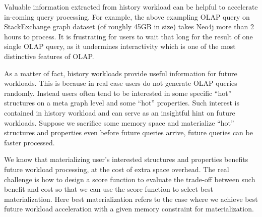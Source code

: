 Valuable information extracted from history workload can be helpful to accelerate in-coming query processing. For example, the above exampling OLAP query on StackExchange graph dataset (of roughly 45GB in size) takes Neo4j more than 2 hours to process. It is frustrating for users to wait that long for the result of one single OLAP query, as it undermines interactivity which is one of the most distinctive features of OLAP. %

As a matter of fact, history workloads provide useful information for future workloads. This is because in real case users do not generate OLAP queries randomly. Instead users often tend to be interested in some specific ``hot'' structures on a meta graph level and some ``hot'' properties. Such interest is contained in history workload and can serve as an insightful hint on future workloads. Suppose we sacrifice some memory space and materialize ``hot'' structures and properties even before future queries arrive, future queries can be faster processed.


We know that materializing user's interested structures and properties benefits future workload processing, at the cost of extra space overhead. The real challenge is how to design a score function to evaluate the trade-off  between such benefit and cost so that we can use the score function to select best materialization. Here best materialization refers to the case where we achieve best future workload acceleration with a given memory constraint for materialization.

	
